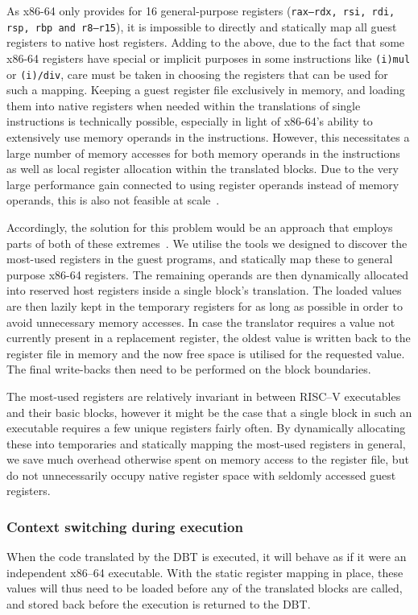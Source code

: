 As x86-64 only provides for 16 general-purpose registers (\texttt{rax--rdx, rsi, rdi, rsp, rbp and r8--r15}), it is impossible to directly and statically map all guest registers to native host registers.
Adding to the above, due to the fact that some x86-64 registers have special or implicit purposes in some instructions like \texttt{(i)mul} or \texttt{(i)/div}, care must be taken in choosing the registers that can be used for such a mapping.
Keeping a guest register file exclusively in memory, and loading them into native registers when needed within the translations of single instructions is technically possible, especially in light of x86-64's ability to extensively use memory operands in the instructions.
However, this necessitates a large number of memory accesses for both memory operands in the instructions as well as local register allocation within the translated blocks.
Due to the very large performance gain connected to using register operands instead of memory operands, this is also not feasible at scale~\cite[S. 8f.]{bintrans}.

Accordingly, the solution for this problem would be an approach that employs parts of both of these extremes~\cite[S. 9]{bintrans}.
We utilise the tools we designed to discover the most-used registers in the guest programs, and statically map these to general purpose x86-64 registers.
The remaining operands are then dynamically allocated into reserved host registers inside a single block's translation.
The loaded values are then lazily kept in the temporary registers for as long as possible in order to avoid unnecessary memory accesses.
In case the translator requires a value not currently present in a replacement register, the oldest value is written back to the register file in memory and the now free space is utilised for the requested value.
The final write-backs then need to be performed on the block boundaries.

The most-used registers are relatively invariant in between RISC--V executables and their basic blocks, however it might be the case that a single block in such an executable requires a few unique registers fairly often.
By dynamically allocating these into temporaries and statically mapping the most-used registers in general, we save much overhead otherwise spent on memory access to the register file, but do not unnecessarily occupy native register space with seldomly accessed guest registers.

\subsubsection{Context switching during execution}
When the code translated by the DBT is executed, it will behave as if it were an independent x86--64 executable.
With the static register mapping in place, these values will thus need to be loaded before any of the translated blocks are called, and stored back before the execution is returned to the DBT.

